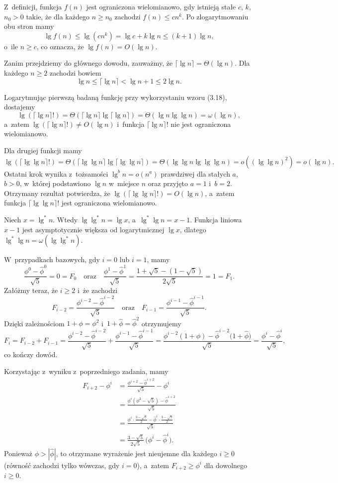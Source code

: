 \exercise %
Z~definicji, funkcja $f(n)$ jest ograniczona wielomianowo, gdy istnieją stałe $c$, $k$, $n_0>0$ takie, że dla każdego $n\ge n_0$ zachodzi $f(n)\le cn^k$.
Po zlogarytmowaniu obu stron mamy
\[
	\lg f(n) \le \lg(cn^k) = \lg c+k\lg n \le (k+1)\lg n,
\]
o~ile $n\ge c$, co oznacza, że $\lg f(n)=O(\lg n)$.

Zanim przejdziemy do głównego dowodu, zauważmy, że $\lceil\lg n\rceil=\Theta(\lg n)$.
Dla każdego $n\ge2$ zachodzi bowiem
\[
	\lg n \le \lceil\lg n\rceil < \lg n+1 \le 2\lg n.
\]

Logarytmując pierwszą badaną funkcję przy wykorzystaniu wzoru (3.18), dostajemy
\[
	\lg(\lceil\lg n\rceil!) = \Theta(\lceil\lg n\rceil\lg\lceil\lg n\rceil) = \Theta(\lg n\lg\lg n) = \omega(\lg n),
\]
a~zatem $\lg(\lceil\lg n\rceil!)\ne O(\lg n)$ i~funkcja $\lceil\lg n\rceil!$ nie jest ograniczona wielomianowo.

Dla drugiej funkcji mamy
\[
	\lg(\lceil\lg\lg n\rceil!) = \Theta(\lceil\lg\lg n\rceil\lg\lceil\lg\lg n\rceil) = \Theta(\lg\lg n\lg\lg\lg n) = o((\lg\lg n)^2) = o(\lg n).
\]
Ostatni krok wynika z~tożsamości $\lg^bn=o(n^a)$ prawdziwej dla stałych $a$, $b>0$, w~której podstawiono $\lg n$ w~miejsce $n$ oraz przyjęto $a=1$ i~$b=2$.
Otrzymany rezultat potwierdza, że $\lg(\lceil\lg\lg n\rceil!)=O(\lg n)$, a~zatem funkcja $\lceil\lg\lg n\rceil!$ jest ograniczona wielomianowo.

\exercise %
Niech $x=\lg^*n$.
Wtedy $\lg\lg^*n=\lg x$, a~$\lg^*\lg n=x-1$.
Funkcja liniowa $x-1$ jest asymptotycznie większa od logarytmicznej $\lg x$, dlatego $\lg^*\lg n=\omega(\lg\lg^*n)$.

\exercise %
W~przypadkach bazowych, gdy $i=0$ lub $i=1$, mamy
\[
	\frac{\phi^0-\widehat\phi^0}{\sqrt{5}} = 0 = F_0 \quad\text{oraz}\quad \frac{\phi^1-\widehat\phi^1}{\sqrt{5}} = \frac{1+\sqrt{5}-\left(1-\sqrt{5}\right)}{2\sqrt{5}} = 1 = F_1.
\]
Załóżmy teraz, że $i\ge2$ i~że zachodzi
\[
	F_{i-2} = \frac{\phi^{i-2}-\widehat\phi^{i-2}}{\sqrt{5}} \quad\text{oraz}\quad F_{i-1} = \frac{\phi^{i-1}-\widehat\phi^{i-1}}{\sqrt{5}}.
\]
Dzięki zależnościom $1+\phi=\phi^2$ i~$1+\widehat\phi=\widehat\phi^2$ otrzymujemy
\[
	F_i = F_{i-2}+F_{i-1} = \frac{\phi^{i-2}-\widehat\phi^{i-2}}{\sqrt{5}}+\frac{\phi^{i-1}-\widehat\phi^{i-1}}{\sqrt{5}} = \frac{\phi^{i-2}(1+\phi)-\widehat\phi^{i-2}\bigl(1+\widehat\phi\bigr)}{\sqrt{5}} = \frac{\phi^i-\widehat\phi^i}{\sqrt{5}},
\]
co kończy dowód.

\exercise %
Korzystając z~wyniku z~poprzedniego zadania, mamy
\begin{align*}
    F_{i+2}-\phi^i &= \frac{\phi^{i+2}-\widehat\phi^{i+2}}{\sqrt{5}}-\phi^i \\[1mm]
	&= \frac{\phi^i(\phi^2-\sqrt{5})-\widehat\phi^{i+2}}{\sqrt{5}} \\[1mm]
	&= \frac{\phi^i\cdot\frac{3-\sqrt{5}}{2}-\widehat\phi^i\cdot\frac{3-\sqrt{5}}{2}}{\sqrt{5}} \\
	&= \frac{3-\sqrt{5}}{2\sqrt{5}}\,\bigl(\phi^i-\widehat\phi^i\bigr).
\end{align*}
Ponieważ $\phi>|\widehat\phi|$, to otrzymane wyrażenie jest nieujemne dla każdego $i\ge0$ (równość zachodzi tylko wówczas, gdy $i=0$), a~zatem $F_{i+2}\ge\phi^i$ dla dowolnego $i\ge0$.
